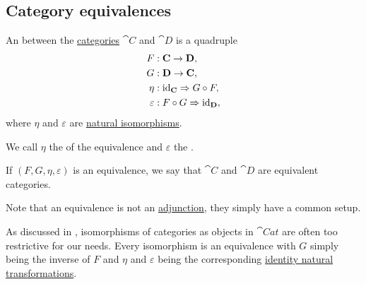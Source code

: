 \subsection{Category equivalences}\label{subsec:category_equivalences}

\begin{definition}\label{def:category_equivalence}
  An  between the \hyperref[def:category]{categories} \( \cat{C} \) and \( \cat{D} \) is a quadruple
  \begin{equation}\label{eq:def:category_equivalence/signature}
    \begin{aligned}
                F &: \cat{C} \to \cat{D}, \\
                G &: \cat{D} \to \cat{C}, \\
             \eta &: \id_{\cat{C}} \Rightarrow G \bincirc F, \\
      \varepsilon &: F \bincirc G \Rightarrow \id_{\cat{D}},
    \end{aligned}
  \end{equation}
  where \( \eta \) and \( \varepsilon \) are \hyperref[thm:natural_isomorphism]{natural isomorphisms}.

  We call \( \eta \) the  of the equivalence and \( \varepsilon \) the .

  If \( (F, G, \eta, \varepsilon) \) is an equivalence, we say that \( \cat{C} \) and \( \cat{D} \) are equivalent categories.

  Note that an equivalence is not an \hyperref[def:category_adjunction]{adjunction}, they simply have a common setup.
\end{definition}

\begin{remark}\label{rem:category_equivalence}
  As discussed in , isomorphisms of categories as objects in \( \cat{Cat} \) are often too restrictive for our needs. Every isomorphism is an equivalence with \( G \) simply being the inverse of \( F \) and \( \eta \) and \( \varepsilon \) being the corresponding \hyperref[eq:def:functor_category/identity]{identity natural transformations}.
\end{remark}

